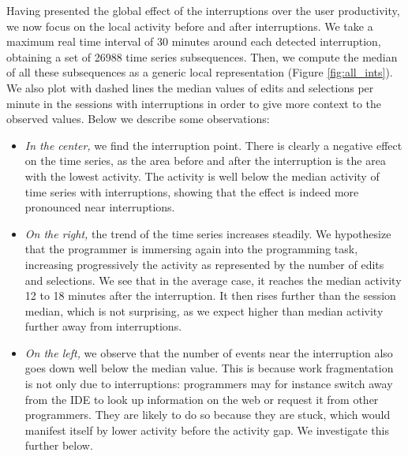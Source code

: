 \documentclass[conference]{IEEEtran}
\begin{document}
Having presented the global effect of the interruptions over the user productivity, we now focus on the local activity before and after interruptions. We take a maximum real time interval of 30 minutes around each detected interruption, obtaining a set of 26988 time series subsequences. Then, we compute the median of all these subsequences as a generic local representation (Figure \ref{fig:all_ints}). We also plot with dashed lines the median values of edits and selections per minute in the sessions with interruptions in order to give more context to the observed values.
Below we describe some observations:
\begin{itemize}
\item \textit{In the center,} we find the interruption point. There is clearly a negative effect on the time series, as the area before and after the interruption is the area with the lowest activity. The activity is well below the median activity of time series with interruptions, showing that the effect is indeed more pronounced near interruptions.

\item \textit{On the right,} the trend of the time series increases steadily. We hypothesize that the programmer is immersing again into the programming task, increasing progressively the activity as represented by the number of edits and selections. We see that in the average case, it reaches the median activity 12 to 18 minutes after the interruption. It then rises further than the session median, which is not surprising, as we expect higher than median activity further away from interruptions.


\item \textit{On the left,} we observe that the number of events near the interruption also goes down well below the median value. This is because work fragmentation is not only due to interruptions: programmers may for instance switch away from the IDE to look up information on the web or request it from other programmers. They are likely to do so because they are stuck, which would manifest itself by lower activity before the activity gap. We investigate this further below.

\end{itemize}
\end{document}
